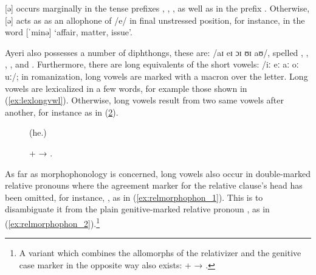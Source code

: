 [ə]  occurs marginally in the tense prefixes ,
, , as well as in the prefix
. Otherwise, [ə]  acts as as an
allophone of /e/ in final unstressed position, for instance, in the word
 [ˈminə] `affair, matter, issue'.

Ayeri also possesses a number of diphthongs, these are: 
/aɪ eɪ ɔɪ ʊɪ aʊ/, spelled , , , , and 
. Furthermore, there are long equivalents of the short vowels: /iː eː 
aː oː uː/; in romanization, long vowels are marked with a macron 
 over the letter. Long vowels are lexicalized in a few words, for 
example those shown in (\ref{ex:lexlongvwl}). Otherwise, long vowels result
from two same vowels after another, for instance as in (\ref{ex:longvwls}).

\begin{figure}[h]
\pex\label{ex:lexlongvwl}
	\a {} 
	\a {} 
	\a {}
		 (he.\Aarg{})\label{ex:laa}
	\a {}
	\a {}\footnotemark
\xe
\end{figure}


\begin{figure}[h]
\ex\label{ex:longvwls}
	 +  → 
	.
\xe
\end{figure}

\label{doublerel}
As far as morphophonology is concerned, long vowels also
occur in double-marked relative pronouns where the agreement marker for the
relative clause's head has been omitted, for instance,
, as in (\ref{ex:relmorphophon_1}).
This is to disambiguate it from the plain genitive-marked relative pronoun
, as in (\ref{ex:relmorphophon_2}).\footnote{A
variant which combines the allomorphs of the relativizer and the genitive case
marker in the opposite way also exists:  +  →
.}

